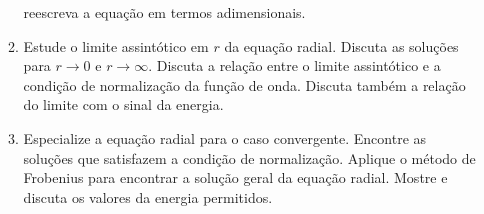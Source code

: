 \begin{enumerate}
\begin{enumerate}
                        reescreva a equação em termos adimensionais.
                  \item Estude o limite assintótico em $r$ da equação radial. Discuta as
                        soluções para $r \to 0$ e $r \to \infty$. Discuta a relação
                        entre o limite assintótico e a condição de normalização da
                        função de onda. Discuta também a relação do limite com o sinal
                        da energia.
                  \item Especialize a equação radial para o caso convergente. Encontre
                        as soluções que satisfazem a condição de normalização. Aplique o
                        método de Frobenius para encontrar a solução geral da equação
                        radial. Mostre e discuta os valores da energia permitidos.
            \end{enumerate}
\end{enumerate}


